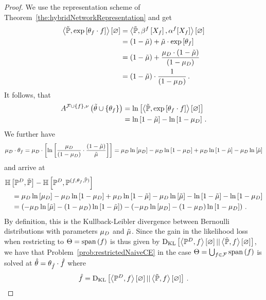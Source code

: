 \begin{proof}
	We use the representation scheme of Theorem~\ref{the:hybridNetworkRepresentation} and get
	\begin{align*}
		\left\langle \tilde{\mathbb{P}}, \mathrm{exp}\left[\theta_{f} \cdot f\right]\right\rangle \left[ \varnothing \right]
		& = \left\langle \tilde{\mathbb{P}}, \beta^{f}\left[X_{f}\right], \alpha^{f}[X_{f}]\right\rangle \left[ \varnothing \right] \\
		& = (1-\tilde{\mu}) + \tilde{\mu}\cdot \mathrm{exp}\left[\theta_{f}\right] \\
		& = (1 - \tilde{\mu}) + \frac{\mu_{D} \cdot (1-\tilde{\mu})}{(1-\mu_{D})} \\
		& = (1-\tilde{\mu}) \cdot \frac{1}{(1-\mu_{D})} \, .
	\end{align*}
	It follows, that
	\begin{align*}
		A^{\mathcal{F}\cup\{f\},\nu}\left(\tilde{\theta}\cup\{\theta_{f}\}\right)
		& = \ln \left[ \left\langle \tilde{\mathbb{P}}, \mathrm{exp}\left[\theta_{f} \cdot f\right]\right\rangle \left[ \varnothing \right] \right] \\
		& = \ln \left[ 1-\tilde{\mu} \right] - \ln \left[ 1-\mu_{D} \right] \, .
	\end{align*}
	We further have
	\begin{align*}
		\mu_{D} \cdot \theta_{f}
		= \mu_{D} \cdot \left[ \ln \left[ \frac{\mu_{D}}{(1-\mu_{D})}\cdot \frac{(1-\tilde{\mu})}{\tilde{\mu}} \right]  \right]
		= \mu_{D} \ln \left[ \mu_{D} \right] - \mu_{D} \ln \left[ 1-\mu_{D} \right] + \mu_{D} \ln \left[ 1-\tilde{\mu} \right] - \mu_{D} \ln \left[ \tilde{\mu} \right]
	\end{align*}
	and arrive at
	\begin{align*}
		& \mathbb{H}\left[\mathbb{P}^{D},\tilde{\mathbb{P}}\right]
		- \mathbb{H}\left[\mathbb{P}^{D},\mathbb{P}^{(f,\theta_{f},\tilde{\mathbb{P}})}\right] \\
		& \quad =  \mu_{D} \ln \left[ \mu_{D} \right] - \mu_{D} \ln \left[ 1-\mu_{D} \right] + \mu_{D} \ln \left[ 1-\tilde{\mu} \right] - \mu_{D} \ln \left[ \tilde{\mu} \right]
		-  \ln \left[ 1-\tilde{\mu} \right] - \ln \left[ 1-\mu_{D} \right] \\
		& \quad = \left( -\mu_{D} \ln \left[ \tilde{\mu} \right] - (1-\mu_{D}) \ln \left[ 1-\tilde{\mu} \right] \right)  - \left( -\mu_{D} \ln \left[ \mu_{D} \right] - (1-\mu_{D}) \ln \left[ 1-\mu_{D} \right] \right) \, .
	\end{align*}
	By definition, this is the Kullback-Leibler divergence between Bernoulli distributions with parameters $\mu_{D}$ and $\tilde{\mu}$.
	Since the gain in the likelihood loss when restricting to $\Theta = \mathrm{span}\left(f\right)$ is thus given by $\mathrm{D}_{\mathrm{KL}}\left[ \left\langle \mathbb{P}^{D},f\right\rangle \left[ \varnothing \right] || \left\langle \tilde{\mathbb{P}},f\right\rangle \left[ \varnothing \right] \right]$, we have that Problem~\ref{prob:restrictedNaiveCE}  in the case $\Theta = \bigcup_{f\in\mathcal{F}}\mathrm{span}\left(f\right)$ is solved at $\hat{\theta} = \theta_{\hat{f}}\cdot \hat{f}$ where
		\[ \hat{f} = \mathrm{D}_{\mathrm{KL}}\left[ \left\langle \mathbb{P}^{D},f\right\rangle \left[ \varnothing \right] || \left\langle \tilde{\mathbb{P}},f\right\rangle \left[ \varnothing \right] \right] \, . \]
\end{proof}

